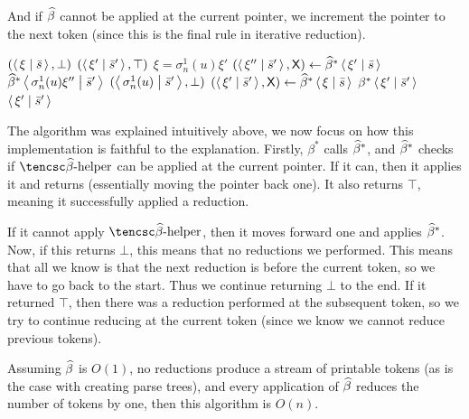 \documentclass{llncs}
\newcounter{algo}
\begin{document}
And if $\widehat\beta$ cannot be applied at the current pointer, we increment the pointer to the next token (since this is the final rule
in iterative reduction).

\begin{algo}
\algorithm
        \If{$\xi=\epsilon$} \Return $(\gen\xi[\bar s],\bot)$
         \Return $(\gen{\xi'}[\bar s'],\top)$
        \Else
            \State $\xi=\sigma^1_n(u)\xi'$
            \State $(\gen{\xi''}[\bar s'],\s X)\gets\hb^*\gen{\xi'}[\bar s]$
             \Return $\hb^*\gen{\sigma^1_n(u)\xi''}[\bar s']$
            \lElse \Return $(\gen{\sigma^1_n(u)}[\bar s'],\bot)$
        \EndIf
    \EndFunc
    \nonum\State
        \State $(\gen{\xi'}[\bar s'],\s X)\gets\hb^*\gen\xi[\bar s]$
         \Return $\beta^*\gen{\xi'}[\bar s']$
        \lElse \Return $\gen{\xi'}[\bar s']$
    \EndFunc
\ealgorithm
\end{algo}

The algorithm was explained intuitively above, we now focus on how this implementation is faithful to the explanation.
Firstly, $\beta^*$ calls $\widehat\beta^*$, and $\widehat\beta^*$ checks if $\bhelp$ can be applied at the current pointer.
If it can, then it applies it and returns (essentially moving the pointer back one).
It also returns $\top$, meaning it successfully applied a reduction.

If it cannot apply $\bhelp$, then it moves forward one and applies $\widehat\beta^*$.
Now, if this returns $\bot$, this means that no reductions we performed.
This means that all we know is that the next reduction is before the current token, so we have to go back to the start.
Thus we continue returning $\bot$ to the end.
If it returned $\top$, then there was a reduction performed at the subsequent token, so we try to continue reducing at the current
token (since we know we cannot reduce previous tokens).

\begin{theorem} \label{thrm:complexity}

    Assuming $\widehat\beta$ is $O(1)$, no reductions produce a stream of printable tokens (as is the case with creating parse trees), and
    every application of $\widehat\beta$ reduces the number of tokens by one, then this algorithm is $O(n)$.

\end{theorem}
\end{document}
